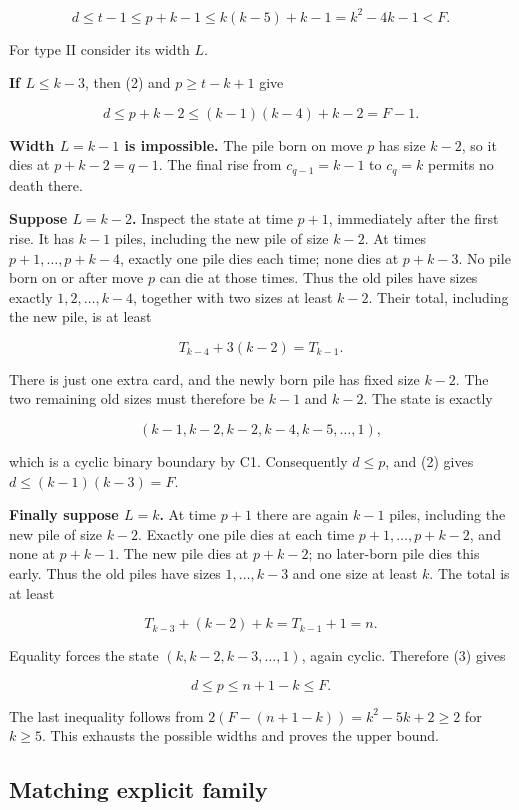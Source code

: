 \documentclass[11pt,a4paper]{article}
\begin{document}
\[
d\le t-1\le p+k-1\le k(k-5)+k-1=k^2-4k-1<F.
\]

For type II consider its width \(L\).

\textbf{If \(L\le k-3\)}, then (2) and \(p\ge t-k+1\) give

\[
d\le p+k-2\le(k-1)(k-4)+k-2=F-1.
\]

\textbf{Width \(L=k-1\) is impossible.} The pile born on move \(p\) has size \(k-2\), so it dies at \(p+k-2=q-1\). The final rise from \(c_{q-1}=k-1\) to \(c_q=k\) permits no death there.

\textbf{Suppose \(L=k-2\).} Inspect the state at time \(p+1\), immediately after the first rise. It has \(k-1\) piles, including the new pile of size \(k-2\). At times \(p+1,\ldots,p+k-4\), exactly one pile dies each time; none dies at \(p+k-3\). No pile born on or after move \(p\) can die at those times. Thus the old piles have sizes exactly \(1,2,\ldots,k-4\), together with two sizes at least \(k-2\). Their total, including the new pile, is at least

\[
T_{k-4}+3(k-2)=T_{k-1}.
\]

There is just one extra card, and the newly born pile has fixed size \(k-2\). The two remaining old sizes must therefore be \(k-1\) and \(k-2\). The state is exactly

\[
(k-1,k-2,k-2,k-4,k-5,\ldots,1),
\]

which is a cyclic binary boundary by C1. Consequently \(d\le p\), and (2) gives \(d\le(k-1)(k-3)=F\).

\textbf{Finally suppose \(L=k\).} At time \(p+1\) there are again \(k-1\) piles, including the new pile of size \(k-2\). Exactly one pile dies at each time \(p+1,\ldots,p+k-2\), and none at \(p+k-1\). The new pile dies at \(p+k-2\); no later-born pile dies this early. Thus the old piles have sizes \(1,\ldots,k-3\) and one size at least \(k\). The total is at least

\[
T_{k-3}+(k-2)+k=T_{k-1}+1=n.
\]

Equality forces the state \((k,k-2,k-3,\ldots,1)\), again cyclic. Therefore (3) gives

\[
d\le p\le n+1-k\le F.
\]

The last inequality follows from \(2(F-(n+1-k))=k^2-5k+2\ge2\) for \(k\ge5\). This exhausts the possible widths and proves the upper bound.

\subsection{Matching explicit family}\label{matching-explicit-family}
\end{document}
